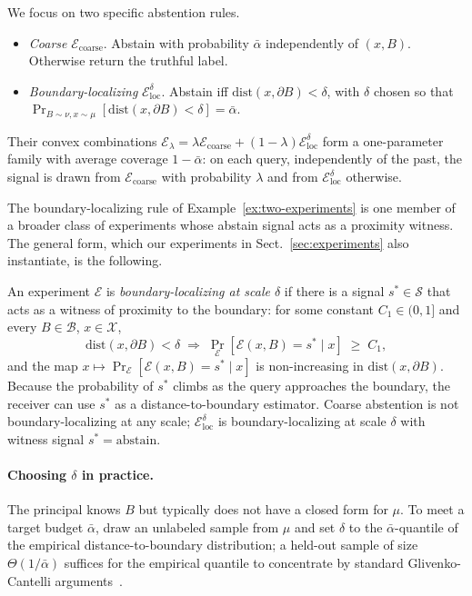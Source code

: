 \documentclass[runningheads,envcountsame]{llncs}
\newcommand{\cB}{\mathcal{B}}
\newcommand{\cX}{\mathcal{X}}
\newcommand{\cS}{\mathcal{S}}
\newcommand{\cE}{\mathcal{E}}
\begin{document}
\begin{example}
\label{ex:two-experiments}
We focus on two specific abstention rules.
\begin{itemize}[nosep]
\item \emph{Coarse} $\cE_{\mathrm{coarse}}$. Abstain with probability $\bar\alpha$ independently of $(x, B)$. Otherwise return the truthful label.
\item \emph{Boundary-localizing} $\cE_{\mathrm{loc}}^\delta$. Abstain iff $\mathrm{dist}(x, \partial B) < \delta$, with $\delta$ chosen so that $\Pr_{B \sim \nu, x \sim \mu}[\mathrm{dist}(x,\partial B) < \delta] = \bar\alpha$.
\end{itemize}
Their convex combinations $\cE_\lambda = \lambda \cE_{\mathrm{coarse}} + (1-\lambda) \cE_{\mathrm{loc}}^\delta$ form a one-parameter family with average coverage $1 - \bar\alpha$: on each query, independently of the past, the signal is drawn from $\cE_{\mathrm{coarse}}$ with probability $\lambda$ and from $\cE_{\mathrm{loc}}^\delta$ otherwise.
\end{example}

The boundary-localizing rule of Example~\ref{ex:two-experiments} is one member of a broader class of experiments whose abstain signal acts as a proximity witness. The general form, which our experiments in Sect.~\ref{sec:experiments} also instantiate, is the following.

\begin{definition}
\label{def:localizing}
An experiment $\cE$ is \emph{boundary-localizing at scale $\delta$} if there is a signal $s^* \in \cS$ that acts as a witness of proximity to the boundary: for some constant $C_1 \in (0, 1]$ and every $B \in \cB$, $x \in \cX$,
\[
\mathrm{dist}(x, \partial B) < \delta \;\Longrightarrow\; \Pr_\cE[\cE(x, B) = s^* \mid x] \;\geq\; C_1,
\]
and the map $x \mapsto \Pr_\cE[\cE(x, B) = s^* \mid x]$ is non-increasing in $\mathrm{dist}(x, \partial B)$.
Because the probability of $s^*$ climbs as the query approaches the boundary, the receiver can use $s^*$ as a distance-to-boundary estimator. Coarse abstention is not boundary-localizing at any scale; $\cE_{\mathrm{loc}}^\delta$ is boundary-localizing at scale $\delta$ with witness signal $s^* = \text{abstain}$.
\end{definition}

\paragraph{Choosing $\delta$ in practice.} The principal knows $B$ but typically does not have a closed form for $\mu$. To meet a target budget $\bar\alpha$, draw an unlabeled sample from $\mu$ and set $\delta$ to the $\bar\alpha$-quantile of the empirical distance-to-boundary distribution; a held-out sample of size $\Theta(1/\bar\alpha)$ suffices for the empirical quantile to concentrate by standard Glivenko-Cantelli arguments~\cite{vapnik1971uniform}.
\end{document}
